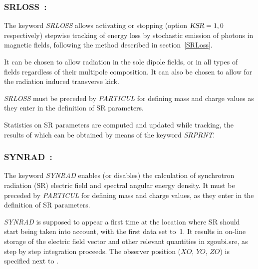 {\subsubsection{SRLOSS~: \SRLOSSTitl\ \cite{FMSEA-00-01} } \label{SRLOSS}
\medskip 
{}

\noindent The keyword \textsl{SRLOSS} allows activating or stopping (option $\textsl{KSR}=1,0$ respectively) 
 stepwise tracking  of energy loss by stochastic emission of 
photons in magnetic fields, following the method described in section~\ref{SRLoss}.  

\bigskip

\noindent  It can be chosen to allow radiation in the sole dipole fields, or in all types of fields regardless of 
their multipole composition.  It can also be chosen to allow for the radiation induced transverse kick. 

\bigskip

\noindent  \textsl{SRLOSS}  must be preceded by \textsl{PARTICUL} for defining  mass and charge 
values as they enter in the definition of SR parameters. 


\bigskip

\noindent  Statistics on SR parameters are  computed and updated while tracking, the results of which can be obtained by means of 
the keyword  \textsl{SRPRNT}. 


\newpage

\subsubsection{SYNRAD~: \SYNRADTitl}\label{SYNRAD}
\medskip 

\noindent The keyword \textsl{SYNRAD} enables (or disables) the calculation of 
synchrotron radiation (SR) electric field and spectral angular energy density. It must be 
preceded by \textsl{PARTICUL} for defining  mass and charge values, as they enter 
in the definition of SR parameters. 

\bigskip

\noindent\textsl{SYNRAD} is supposed to appear a first time at the 
location where SR should start being taken into account, with the first data \textsl{\KSR} set 
to~1. It results in on-line storage of the electric field vector and 
other relevant quantities in zgoubi.sre, as step by step integration 
proceeds. The observer position ($XO$, $YO$, $ZO$) is specified next 
to \textsl{\KSR}.

}
